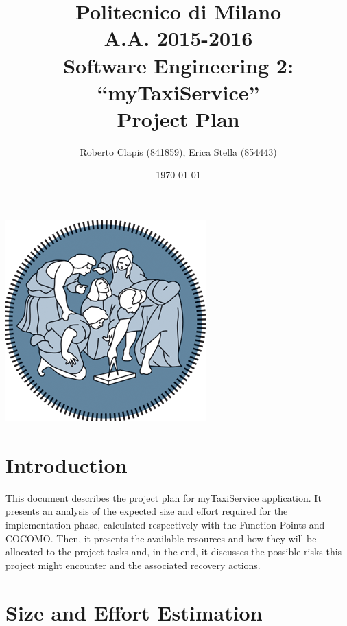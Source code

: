 \documentclass{article}
\author{Roberto Clapis (841859), Erica Stella (854443)}
\date{\today}
\title{Politecnico di Milano
	\\A.A. 2015\@-\@2016
	\\Software Engineering 2: ``myTaxiService''
	\\\textbf{P}roject \textbf{P}lan}
\begin{document}
\maketitle
\begin{center}
	\includegraphics{polimi-logo}
\end{center}
\clearpage
\tableofcontents
\clearpage
\section{Introduction}
This document describes the project plan for myTaxiService application.
It presents an analysis of the expected size and effort required 
for the implementation phase, calculated respectively with the Function
Points and COCOMO\@. Then, it presents the available resources and how 
they will be allocated to the project tasks and, in the end, it
discusses the possible risks this project might encounter and the
associated recovery actions.
\section{Size and Effort Estimation}
\end{document}
